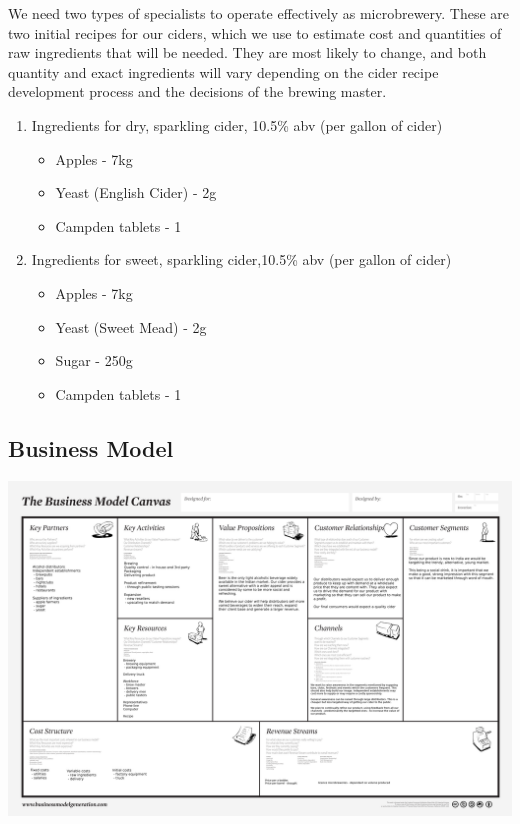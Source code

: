 \documentclass[11pt]{article}
\begin{document}
\noindent We need two types of specialists to operate effectively as microbrewery. These are two initial recipes for our ciders, which we use to estimate cost and quantities of raw ingredients that will be needed. They are most likely to change, and both quantity and exact ingredients will vary depending on the cider recipe development process and the decisions of the brewing master.

  \begin{enumerate}
    \item Ingredients for dry, sparkling cider, 10.5\% abv (per gallon of cider)
	  \begin{itemize}
	   \item Apples - 7kg
	   \item Yeast (English Cider) - 2g
	   \item Campden tablets - 1
       \end{itemize}
	\item Ingredients for sweet, sparkling cider,10.5\% abv (per gallon of cider)
	  \begin{itemize}
	  \item Apples - 7kg
	  \item Yeast (Sweet Mead) - 2g
	  \item Sugar - 250g
	  \item Campden tablets - 1
	  \end{itemize}
	\end{enumerate}

  \newpage
  \subsection{Business Model}
  \includegraphics[angle=90,width=\textwidth,height=\textheight,keepaspectratio]{./business_model_canvas_poster.png}
\end{document}
